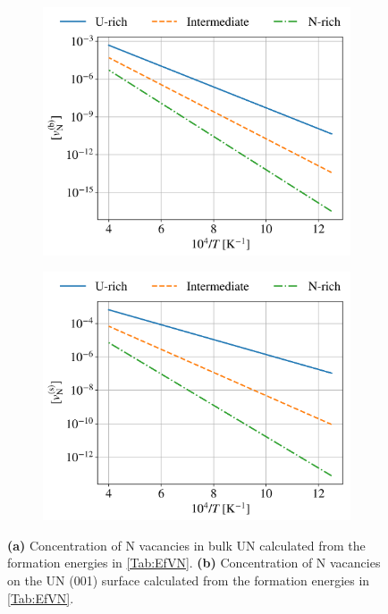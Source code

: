 \documentclass[preprint,12pt,sort&compress]{elsarticle}
\newcommand{\?}{\stackrel{?}{=}}
\begin{document}
\begin{figure}[h!]
\centering
\begin{subfigure}{0.45\textwidth}
    \includegraphics[width=\textwidth]{VN.png}
    \caption{}
    \label{Fig:VN}
\end{subfigure}
\hfill
\begin{subfigure}{0.45\textwidth}
    \includegraphics[width=\textwidth]{VNs.png}
    \caption{}
    \label{Fig:VNs}
\end{subfigure}
\caption{\textbf{(a)} Concentration of N vacancies in bulk UN calculated from the formation energies in \cref{Tab:EfVN}. \textbf{(b)} Concentration of N vacancies on the UN (001) surface calculated from the formation energies in \cref{Tab:EfVN}.}
\label{1}
\end{figure}
\end{document}
